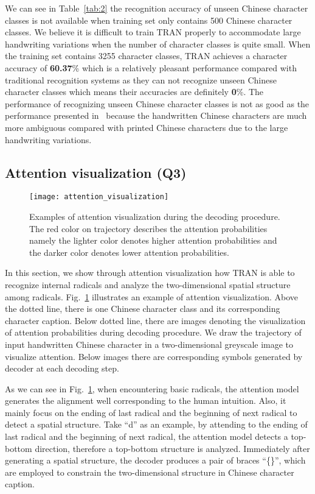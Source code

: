 \documentclass[a4paper,conference]{IEEEtran}
\begin{document}
We can see in Table~\ref{tab:2} the recognition accuracy of unseen Chinese character classes is not available when training set only contains 500 Chinese character classes. We believe it is difficult to train TRAN properly to accommodate large handwriting variations when the number of character classes is quite small. When the training set contains 3255 character classes, TRAN achieves a character accuracy of \textbf{60.37}\% which is a relatively pleasant performance compared with traditional recognition systems as they can not recognize unseen Chinese character classes which means their accuracies are definitely \textbf{0}\%. The performance of recognizing unseen Chinese character classes is not as good as the performance presented in~\cite{zhang2017ran} because the handwritten Chinese characters are much more ambiguous compared with printed Chinese characters due to the large handwriting variations.


\subsection{Attention visualization (Q3)}
\label{sec:Attention visualization (Q3)}

\begin{figure}
\centering
\texttt{[image: attention\_visualization]}
\caption{Examples of attention visualization during the decoding procedure. The red color on trajectory describes the attention probabilities namely the lighter color denotes higher attention probabilities and the darker color denotes lower attention probabilities.}
\label{fig:attention_visualization}
\end{figure}

In this section, we show through attention visualization how TRAN is able to recognize internal radicals and analyze the two-dimensional spatial structure among radicals. Fig.~\ref{fig:attention_visualization} illustrates an example of attention visualization. Above the dotted line, there is one Chinese character class and its corresponding character caption. Below dotted line, there are images denoting the visualization of attention probabilities during decoding procedure. We draw the trajectory of input handwritten Chinese character in a two-dimensional greyscale image to visualize attention. Below images there are corresponding symbols generated by decoder at each decoding step.

As we can see in Fig.~\ref{fig:attention_visualization}, when encountering basic radicals, the attention model generates the alignment well corresponding to the human intuition. Also, it mainly focus on the ending of last radical and the beginning of next radical to detect a spatial structure. Take ``d'' as an example, by attending to the ending of last radical and the beginning of next radical, the attention model detects a top-bottom direction, therefore a top-bottom structure is analyzed. Immediately after generating a spatial structure, the decoder produces a pair of braces ``\{\}'', which are employed to constrain the two-dimensional structure in Chinese character caption.
\end{document}
